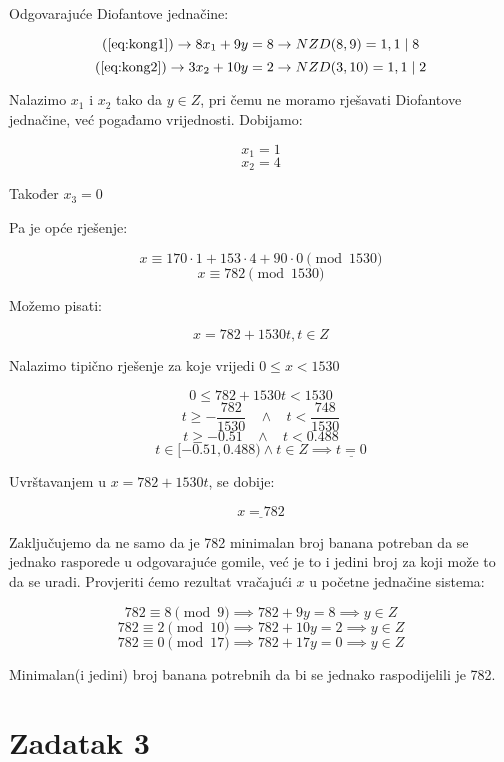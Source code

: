 \documentclass[12pt]{article}
\begin{document}
Odgovarajuće Diofantove jednačine:

$$(\ref{eq:kong1}) \to 8x_{1} + 9y = 8 \to NZD(8, 9) = 1, 1 \mid 8$$
$$(\ref{eq:kong2}) \to 3x_{2} + 10y = 2 \to NZD(3, 10) = 1, 1 \mid 2$$\vspace{1mm}

Nalazimo $x_{1}$ i $x_{2}$ tako da $y \in Z$, pri čemu ne moramo rješavati Diofantove jednačine, već pogađamo vrijednosti. Dobijamo:

$$x_{1} = 1$$
$$x_{2} = 4$$
\begin{center}
Također $x_{3} = 0$
\end{center}

Pa je opće rješenje:

$$x \equiv 170 \cdot 1 + 153 \cdot 4 + 90 \cdot 0 \pmod{1530}$$
$$x \equiv 782 \pmod{1530}$$

Možemo pisati:

$$x = 782 + 1530t, t\in Z$$\vspace{1mm}

Nalazimo tipično rješenje za koje vrijedi $0 \leq x < 1530$

$$0 \leq 782 + 1530t < 1530$$\vspace{1mm}
$$t \geq - \frac{782}{1530} \>\>\>\> \land \>\>\>\> t < \frac{748}{1530}$$\vspace{1mm}
$$t \geq - 0.51 \>\>\>\> \land \>\>\>\> t < 0.488$$\vspace{1mm}
$$t\in [-0.51, 0.488) \land t \in Z \implies \underline{t = 0}$$\vspace{1mm}

Uvrštavanjem u $x = 782 + 1530t$, se dobije:

$$\underline{x = 782}$$\vspace{1mm}

Zaključujemo da ne samo da je 782 minimalan broj banana potreban da se jednako rasporede u odgovarajuće gomile, već je to i jedini broj za koji može to da se uradi. Provjeriti ćemo rezultat vračajući $x$ u početne jednačine sistema:

$$782 \equiv 8 \pmod{9} \implies 782 + 9y = 8 \implies y \in Z$$
$$782 \equiv 2 \pmod{10} \implies 782 + 10y = 2 \implies y \in Z$$
$$782 \equiv 0 \pmod{17} \implies 782 + 17y = 0 \implies y \in Z$$\vspace{1mm}

Minimalan(i jedini) broj banana potrebnih da bi se jednako raspodijelili je 782.

\newpage

\section*{Zadatak 3\label{Z3}}
\end{document}
